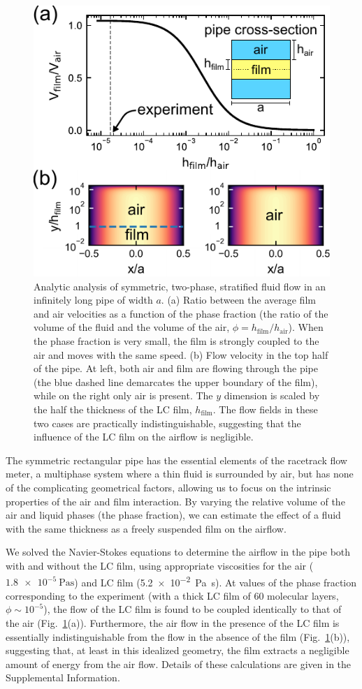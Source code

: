 \documentclass[aagreenthesis]{subfiles}
\begin{document}
\begin{figure}[h!]
\centering
\includegraphics[keepaspectratio=true,width=.6\textwidth]{./figs/racetrack/theory/theory-final.pdf}
    \caption{Analytic analysis of symmetric, two-phase, stratified fluid flow in an infinitely long
    pipe of width $a$. (a) Ratio between the average film and air
    velocities as a function of the phase fraction (the ratio of the volume of the
    fluid and the volume of the air, $\phi=h_\text{film}/h_\text{air}$). When
    the phase fraction is very small, the film is strongly
    coupled to the air and moves with the same speed. (b) Flow velocity in the top half of the pipe. At left, both
    air and film are flowing through the pipe (the blue dashed line demarcates
    the upper boundary of the film), while on the right only air is present. The
    $y$ dimension is scaled by the half the thickness of the
    LC film, $h_\text{film}$. The flow fields in these two cases are practically indistinguishable, suggesting that the
    influence of the LC film on the airflow is negligible.
\label{fig:theory}}
\end{figure}

The symmetric rectangular pipe has the essential elements of the racetrack
flow meter, a multiphase system where a thin fluid is surrounded by air, but has
none of the complicating geometrical factors, allowing us to focus on the
intrinsic properties of the air and film interaction. By varying the relative
volume of the
air and liquid phases (the phase fraction), we can estimate the effect of a
fluid with the same thickness as a freely suspended film on the airflow.

We solved the Navier-Stokes equations to determine the airflow in the pipe both with and without the LC film,
using appropriate viscosities for
the air ($\SI{1.8e-5}{\pascal\second}$) and LC film
(\SI{5.2e-2}{\pascal \second})\cite{Schneider2006}. At
values of the phase fraction corresponding to the experiment (with a thick LC
film of 60 molecular layers, $\phi \sim 10^{-5}$),
the flow of the LC film is found to be coupled identically to that of the air  (Fig.~\ref{fig:theory}(a)).
Furthermore, the air flow in the presence of the LC film is essentially
indistinguishable from the flow in the absence of the film (Fig.~\ref{fig:theory}(b)), suggesting that, at least in
this idealized geometry, the film extracts a negligible amount of energy from
the air flow. Details of these calculations are given in the Supplemental
Information.
\end{document}
